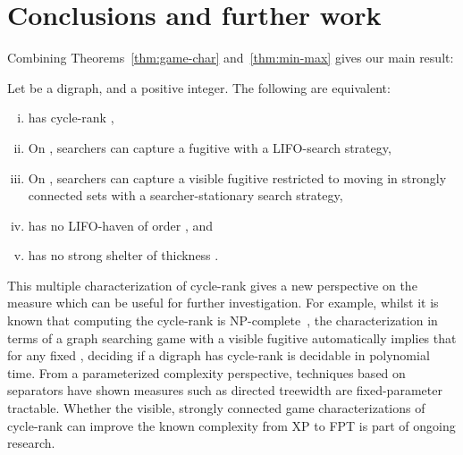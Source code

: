 \documentclass{llncs}
\begin{document}
\section{Conclusions and further work}\label{sec:conc}
Combining Theorems~\ref{thm:game-char} and~\ref{thm:min-max} gives our main result:
\begin{mainthm}
Let  be a digraph, and  a positive integer.  The following are equivalent:
\begin{enumerate}[(i) ]
\item  has cycle-rank ,
\item On ,  searchers can capture a fugitive with a LIFO-search strategy,
\item On ,  searchers can capture a visible fugitive restricted to moving in strongly connected sets with a searcher-stationary search strategy, 
\item  has no LIFO-haven of order , and
\item  has no strong shelter of thickness .
\end{enumerate}
\end{mainthm}
This multiple characterization of cycle-rank gives a new perspective on the measure which can be useful for further investigation.  For example, whilst it is known that computing the cycle-rank is NP-complete~\cite{Gru08}, the characterization in terms of a graph searching game with a visible fugitive automatically implies that for any fixed , deciding if a digraph has cycle-rank  is decidable in polynomial time.  From a parameterized complexity perspective, techniques based on separators have shown measures such as directed treewidth are fixed-parameter tractable.  Whether the visible, strongly connected game characterizations of cycle-rank can improve the known complexity from XP to FPT is part of ongoing research.
\end{document}
